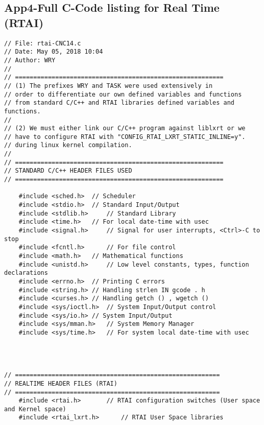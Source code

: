 \pagebreak
\subsection{App4-Full C-Code listing for Real Time (RTAI)}
\begin{lstlisting}[caption={App4-Full C-Code listing for Real Time (RTAI)}, label=App4-Full C-Code listing for Real Time (RTAI)]
// File: rtai-CNC14.c
// Date: May 05, 2018 10:04
// Author: WRY
// 
// =========================================================
// (1) The prefixes WRY and TASK were used extensively in
// order to differentiate our own defined variables and functions 
// from standard C/C++ and RTAI libraries defined variables and functions.
// 
// (2) We must either link our C/C++ program against liblxrt or we 
// have to configure RTAI with "CONFIG_RTAI_LXRT_STATIC_INLINE=y".
// during linux kernel compilation.
//
// =========================================================
// STANDARD C/C++ HEADER FILES USED
// ========================================================= 

	#include <sched.h>	// Scheduler
	#include <stdio.h>	// Standard Input/Output 
	#include <stdlib.h> 	// Standard Library
	#include <time.h>	// For local date-time with usec
	#include <signal.h> 	// Signal for user interrupts, <Ctrl>-C to stop 
	#include <fcntl.h>  	// For file control
	#include <math.h>	// Mathematical functions
	#include <unistd.h> 	// Low level constants, types, function declarations
	#include <errno.h>	// Printing C errors
	#include <string.h>	// Handling strlen IN gcode . h
	#include <curses.h>	// Handling getch () , wgetch ()
	#include <sys/ioctl.h>	// System Input/Output control
	#include <sys/io.h>	// System Input/Output
	#include <sys/mman.h>	// System Memory Manager
	#include <sys/time.h>	// For system local date-time with usec




// ========================================================
// REALTIME HEADER FILES (RTAI)
// ========================================================
	#include <rtai.h>		// RTAI configuration switches (User space and Kernel space)
	#include <rtai_lxrt.h>  	// RTAI User Space libraries


\end{lstlisting}
